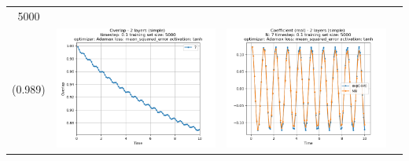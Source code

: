 \documentclass{article}
\begin{document}
\begin{tabular}{|c|c|c|c|}
     5000 \\ (0.989) &
     \includegraphics[scale=0.37]{./Searching_for_good_train_set_size/2_layers_simple_train_samples=5000_timestep=0.1_t_total=10.0_optimizer=Adamax_loss=mean_squared_error_activation=tanh/Overlap.png} &
     \includegraphics[scale=0.37]{./Searching_for_good_train_set_size/2_layers_simple_train_samples=5000_timestep=0.1_t_total=10.0_optimizer=Adamax_loss=mean_squared_error_activation=tanh/Coeff_N=7_(real).png} &

\end{tabular}
\end{document}
